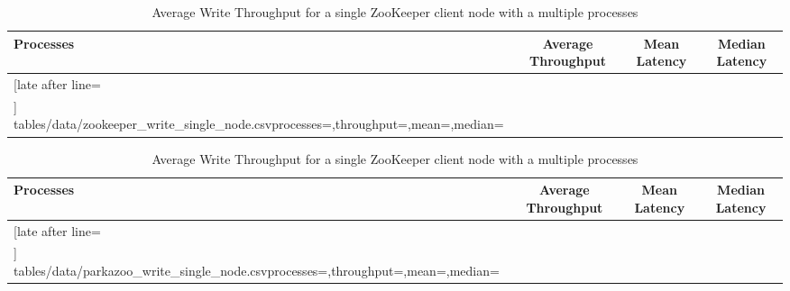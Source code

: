\begin{table}[ht!]
	\begin{subtable}{1.0\linewidth}
		\centering
		\begin{tabular}{|l|c|c|c|}\hline%
			\textbf{Processes}   & \textbf{Average Throughput} & \textbf{Mean Latency} & \textbf{Median Latency} \\\hline
			\csvreader[late after line=\\\hline]%
			{tables/data/zookeeper_write_single_node.csv}{processes=\processes,throughput=\throughput,mean=\mean,median=\median}%
			{\processes & \throughput & \mean & \median}%
		\end{tabular}
		\caption{ZooKeeper}
		\label{table:single_node_zookeeper_throughput}
	\end{subtable}
	\begin{subtable}{1.0\linewidth}
		\centering
		\begin{tabular}{|l|c|c|c|}\hline%
			\textbf{Processes}   & \textbf{Average Throughput} & \textbf{Mean Latency} & \textbf{Median Latency} \\\hline
			\csvreader[late after line=\\\hline]%
			{tables/data/parkazoo_write_single_node.csv}{processes=\processes,throughput=\throughput,mean=\mean,median=\median}%
			{\processes & \throughput & \mean & \median}%
		\end{tabular}
		\caption{ParKazoo}
		\label{table:single_node_parkazoo_throughput}
	\end{subtable}
	\caption{Average Write Throughput for a single ZooKeeper client node with a multiple processes}
	\label{table:single_node_write_throughput}
\end{table}
